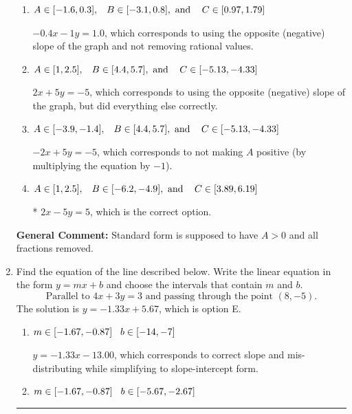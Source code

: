 \documentclass{extbook}[14pt]
\newcommand{\litem}[1]{\item #1

\rule{\textwidth}{0.4pt}}
\begin{document}
\begin{enumerate}
{\begin{enumerate}[label=\Alph*.]
 $-0.4x + 1y = -1.0$, which corresponds to not removing rational values for Standard Form.
\item \( A \in [-1.6, 0.3], \hspace{3mm} B \in [-3.1, 0.8], \text{ and } \hspace{3mm} C \in [0.97, 1.79] \)

 $-0.4x - 1y = 1.0$, which corresponds to using the opposite (negative) slope of the graph and not removing rational values.
\item \( A \in [1, 2.5], \hspace{3mm} B \in [4.4, 5.7], \text{ and } \hspace{3mm} C \in [-5.13, -4.33] \)

 $2x + 5y = -5$, which corresponds to using the opposite (negative) slope of the graph, but did everything else correctly.
\item \( A \in [-3.9, -1.4], \hspace{3mm} B \in [4.4, 5.7], \text{ and } \hspace{3mm} C \in [-5.13, -4.33] \)

 $-2x + 5y = -5$, which corresponds to not making $A$ positive (by multiplying the equation by $-1$).
\item \( A \in [1, 2.5], \hspace{3mm} B \in [-6.2, -4.9], \text{ and } \hspace{3mm} C \in [3.89, 6.19] \)

* $2x - 5y = 5$, which is the correct option.
\end{enumerate}

\textbf{General Comment:} Standard form is supposed to have $A > 0$ and all fractions removed.
}
\litem{
Find the equation of the line described below. Write the linear equation in the form $ y=mx+b $ and choose the intervals that contain $m$ and $b$.
\[ \text{Parallel to } 4 x + 3 y = 3 \text{ and passing through the point } (8, -5). \]The solution is \( y = -1.33x + 5.67 \), which is option E.\begin{enumerate}[label=\Alph*.]
\item \( m \in [-1.67, -0.87] \hspace*{3mm} b \in [-14, -7] \)

 $y = -1.33x - 13.00$, which corresponds to correct slope and mis-distributing while simplifying to slope-intercept form.
\item \( m \in [-1.67, -0.87] \hspace*{3mm} b \in [-5.67, -2.67] \)


\end{enumerate}}
\end{enumerate}
\end{document}
